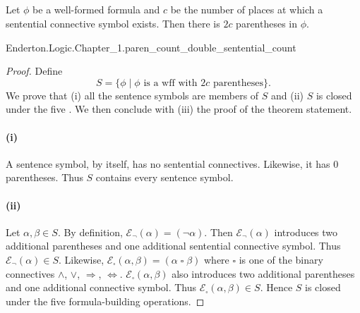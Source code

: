 \documentclass{report}
\begin{document}
\subsection{}%

  \begin{lemma}
    Let $\phi$ be a well-formed formula and $c$ be the number of places at which
      a sentential connective symbol exists.
    Then there is $2c$ parentheses in $\phi$.
  \end{lemma}

    {Enderton.Logic.Chapter\_1.paren\_count\_double\_sentential\_count}

  \begin{proof}

    Define $$S = \{ \phi \mid
      \phi \text{ is a wff with } 2c \text{ parentheses} \}.$$
    We prove that (i) all the sentence symbols are members of $S$ and (ii)
      $S$ is closed under the five .
    We then conclude with (iii) the proof of the theorem statement.

    \paragraph{(i)}%

      A sentence symbol, by itself, has no sentential connectives.
      Likewise, it has 0 parentheses.
      Thus $S$ contains every sentence symbol.

    \paragraph{(ii)}%

      Let $\alpha, \beta \in S$.
      By definition, $\mathcal{E}_{\neg}(\alpha) = (\neg \alpha)$.
      Then $\mathcal{E}_{\neg}(\alpha)$ introduces two additional parentheses
         and one additional sentential connective symbol.
      Thus $\mathcal{E}_{\neg}(\alpha) \in S$.
      Likewise,
        $\mathcal{E}_{\square}(\alpha, \beta) = (\alpha \mathop{\square} \beta)$
        where $\square$ is one of the binary connectives $\land$, $\lor$,
          $\Rightarrow$, $\Leftrightarrow$.
      $\mathcal{E}_{\square}(\alpha, \beta)$ also introduces two additional
        parentheses and one additional connective symbol.
      Thus $\mathcal{E}_{\square}(\alpha, \beta) \in S$.
      Hence $S$ is closed under the five formula-building operations.


\end{proof}
\end{document}
